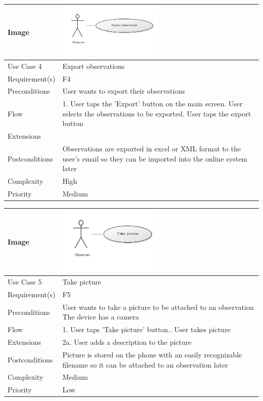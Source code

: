\begin{tabular}[t]{|l|p{}|}\hline
	Image&\includegraphics[width=0.5\textwidth]{reqspec/uc/export.png} \\\hline
	Use Case 4&Export  observations\\\hline
	Requirement(s)&F4\\\hline
	Preconditions& User wants to export their observations \\\hline
	Flow&1. User taps the 'Export' button on the main screen\newline
	2. User selects the observations to be exported\newline
	3. User taps the export button\\\hline
	Extensions& \\\hline
	Postconditions&Observations are exported in excel or XML format to the user's email so they can be imported into the online system later\\\hline
	Complexity&High\\\hline
	Priority&Medium\\\hline
\end{tabular}

\hspace{2em}


\begin{tabular}[t]{|l|p{}|}\hline
	Image&\includegraphics[width=0.5\textwidth]{reqspec/uc/takepicture.png} \\\hline
	Use Case 5&Take picture\\\hline
	Requirement(s)&F5\\\hline
	Preconditions&User wants to take a picture to be attached to an observation\newline
	The device has a camera\\\hline
	Flow&1. User taps 'Take picture' button.\newline
	2. User takes picture \\\hline
	Extensions& 2a. User adds a description to the picture\\\hline
	Postconditions&Picture is stored on the phone with an easily recognizable filename so it can be attached to an observation 	later\\\hline
	Complexity&Medium\\\hline
	Priority&Low\\\hline
\end{tabular}
	
